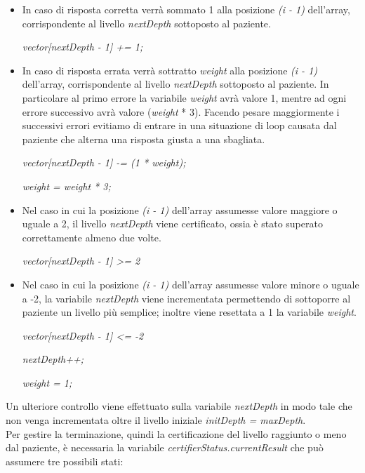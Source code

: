 \documentclass[
	corpo=12pt,
	twoside,
 	evenboxes,
	tipotesi=triennale,
    	stile=classica,
   	 greek,
]{toptesi}
\begin{document}
\begin{itemize}
\item In caso di risposta corretta verrà sommato 1 alla posizione \textit{(i - 1)} dell'array, corrispondente al livello \textit{nextDepth} sottoposto al paziente.

\textit{vector[nextDepth - 1] += 1;}

\item In caso di risposta errata verrà sottratto \textit{weight} alla posizione \textit{(i - 1)} dell'array, corrispondente al livello \textit{nextDepth} sottoposto al paziente. In particolare al primo errore la variabile \textit{weight} avrà valore 1, mentre ad ogni errore successivo avrà valore (\textit{weight} * 3). Facendo pesare maggiormente i successivi errori evitiamo di entrare in una situazione di loop causata dal paziente che alterna una risposta giusta a una sbagliata. 

\textit{vector[nextDepth - 1] -= (1 * weight);}

\textit{weight = weight * 3;}

\item Nel caso in cui la posizione \textit{(i - 1)} dell'array assumesse valore maggiore o uguale a 2, il livello \textit{nextDepth} viene certificato, ossia è stato superato correttamente almeno due volte.

\textit{vector[nextDepth - 1] >= 2}

\item Nel caso in cui la posizione \textit{(i - 1)} dell'array assumesse valore minore o uguale a -2, la variabile \textit{nextDepth} viene incrementata permettendo di sottoporre al paziente un livello più semplice; inoltre viene resettata a 1 la variabile \textit{weight}.

\textit{vector[nextDepth - 1] <= -2}

\textit{nextDepth++;}

\textit{weight = 1;}

\end{itemize}

Un ulteriore controllo viene effettuato sulla variabile \textit{nextDepth} in modo tale che non venga incrementata oltre il livello iniziale \textit{initDepth = maxDepth}.\\

Per gestire la terminazione, quindi la certificazione del livello raggiunto o meno dal paziente, è necessaria la variabile \textit{certifierStatus.currentResult} che può assumere tre possibili stati:
\end{document}
